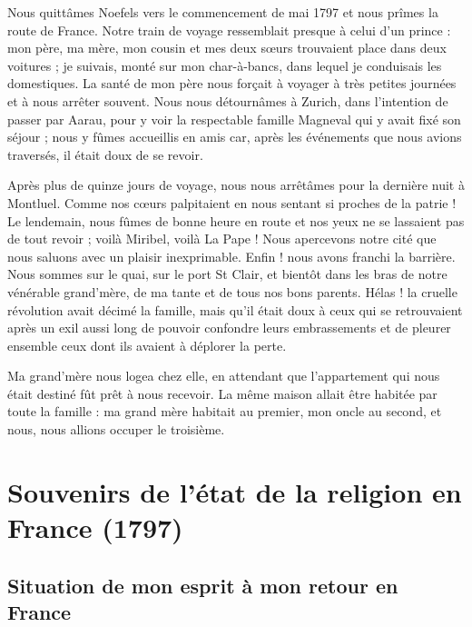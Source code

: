 \documentclass[11pt,a4paper]{report}
\begin{document}
Nous quittâmes Noefels vers le commencement de mai 1797 et nous prîmes la route de France. Notre train de voyage ressemblait presque à celui d'un prince : mon père, ma mère, mon cousin et mes deux sœurs trouvaient place dans deux voitures ; je suivais, monté sur mon char-à-bancs, dans lequel je conduisais les domestiques. La santé de mon père nous forçait à voyager à très petites journées et à nous arrêter souvent. Nous nous détournâmes à Zurich, dans l'intention de passer par Aarau, pour y voir la respectable famille Magneval qui y avait fixé son séjour ; nous y fûmes accueillis en amis car, après les événements que nous avions traversés, il était doux de se revoir.

Après plus de quinze jours de voyage, nous nous arrêtâmes pour la dernière nuit à Montluel. Comme nos cœurs palpitaient en nous sentant si proches de la patrie ! Le lendemain, nous fûmes de bonne heure en route et nos yeux ne se lassaient pas de tout revoir ; voilà Miribel, voilà La Pape ! Nous apercevons notre cité que nous saluons avec un plaisir inexprimable. Enfin ! nous avons franchi la barrière. Nous sommes sur le quai, sur le port St Clair, et bientôt dans les bras de notre vénérable grand'mère, de ma tante et de tous nos bons parents. Hélas ! la cruelle révolution avait décimé la famille, mais qu'il était doux à ceux qui se retrouvaient après un exil aussi long de pouvoir confondre leurs embrassements et de pleurer ensemble ceux dont ils avaient à déplorer la perte.

Ma grand'mère nous logea chez elle, en attendant que l'appartement qui nous était destiné fût prêt à nous recevoir. La même maison allait être habitée par toute la famille : ma grand mère habitait au premier, mon oncle au second, et nous, nous allions occuper le troisième.

\chapter{Souvenirs de l'état de la religion en France (1797)}

\section*{Situation de mon esprit à mon retour en France}
\end{document}
